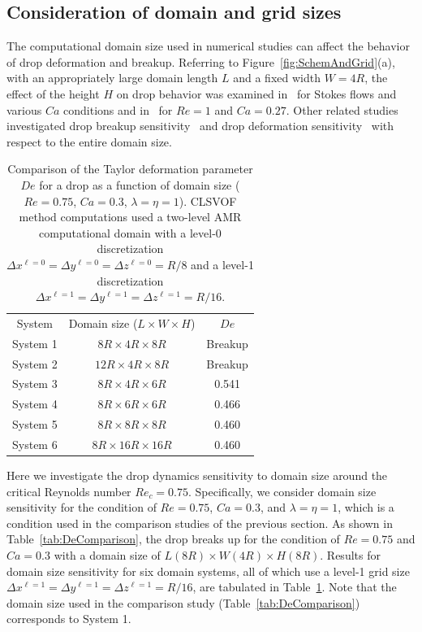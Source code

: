 \documentclass[%
 reprint,
 showkeys,
 amsmath,amssymb,
 aps,
 prfluids,
 onecolumn
]{revtex4-2}
\newcommand{\LWH}{L\times W \times H}
\newcommand{\lwh}[3]{L(#1R)\times W(#2R) \times H(#3R)}
\begin{document}
\subsection{Consideration of domain and grid sizes}\label{sec:DomGrdSize}
The computational domain size used in numerical studies can affect the behavior
of drop deformation and breakup.  Referring to
Figure~\ref{fig:SchemAndGrid}(a), with an appropriately large domain length $L$
and a fixed width $W=4R$, the effect of the height $H$ on drop behavior was
examined in~\cite{LiRenRen00} for Stokes flows and various $Ca$ conditions and
in~\cite{KomShaEskDer14} for $Re=1$ and $Ca=0.27$.  Other related studies
investigated drop breakup sensitivity~\cite{RenCri01-1} and drop deformation
sensitivity~\cite{RenCriLi02} with respect to the entire domain size.
%
\begin{table}[tbh]
\caption{Comparison of the Taylor deformation parameter $De$ for a drop as a function of
         domain size ($Re=0.75$, $Ca=0.3$, $\lambda = \eta = 1$).
         CLSVOF method computations used a two-level AMR computational domain 
         with a level-0 discretization $\Delta x^{\ell=0} = \Delta y^{\ell=0} 
         = \Delta z^{\ell=0} = R/8$ and a level-1 discretization
         $\Delta x^{\ell=1} = \Delta y^{\ell=1} = \Delta z^{\ell=1} = R/16$.}
\label{tab:DomComparison}
\center
\begin{tabular}{ c  c  c}
\hline
\hline
System      & Domain size ($\LWH$)         & $De$    \\
System 1    & $8R  \times 4R  \times 8R$   & Breakup \\
System 2    & $12R \times 4R  \times 8R$   & Breakup \\
System 3    & $8R  \times 4R  \times 6R$   & 0.541   \\
System 4    & $8R  \times 6R  \times 6R$   & 0.466   \\
System 5    & $8R  \times 8R  \times 8R$   & 0.460   \\
System 6    & $8R  \times 16R \times 16R$  & 0.460   \\
\hline
\hline
\end{tabular}
\end{table}
%

Here we investigate the drop dynamics sensitivity to domain size around the
critical Reynolds number $Re_{c}=0.75$.  Specifically, we consider domain size
sensitivity for the condition of $Re=0.75$, $Ca=0.3$, and $\lambda = \eta = 1$,
which is a condition used in the comparison studies of the previous section.
As shown in Table~\ref{tab:DeComparison}, the drop breaks up for the condition
of $Re=0.75$ and $Ca=0.3$ with a domain size of $\lwh{8}{4}{8}$.  Results for
domain size sensitivity for six domain systems, all of which use a level-1 grid
size $\Delta x^{\ell=1} = \Delta y^{\ell=1}= \Delta z^{\ell=1} = R/16$, are
tabulated in Table~\ref{tab:DomComparison}. Note that the domain size used in
the comparison study (Table~\ref{tab:DeComparison}) corresponds to System 1.
\end{document}
